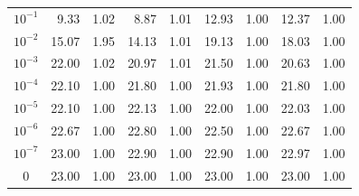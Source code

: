 \documentclass{article}
\begin{document}
\begin{table}[t]
\begin{tabular}{| c | r  r | r  r | r  r | r  r |}
$10^{-1}$        & 9.33  & 1.02  & 8.87  & 1.01  & 12.93        & 1.00         & 12.37        & 1.00        \\
$10^{-2}$        & 15.07         & 1.95  & 14.13         & 1.01  & 19.13        & 1.00         & 18.03        & 1.00        \\
$10^{-3}$        & 22.00         & 1.02  & 20.97         & 1.01  & 21.50         & 1.00  & 20.63         & 1.00 \\
$10^{-4}$        & 22.10         & 1.00  & 21.80         & 1.00  & 21.93         & 1.00  & 21.80         & 1.00 \\
$10^{-5}$        & 22.10         & 1.00  & 22.13        & 1.00         & 22.00         & 1.00  & 22.03         & 1.00 \\
$10^{-6}$	 & 22.67	 & 1.00	 & 22.80	 & 1.00	 & 22.50	 & 1.00	 & 22.67	 & 1.00	\\
$10^{-7}$	 & 23.00	 & 1.00	 & 22.90	 & 1.00	 & 22.90	 & 1.00	 & 22.97	 & 1.00	\\
0        & 23.00         & 1.00          & 23.00        & 1.00         & 23.00        & 1.00         & 23.00        & 1.00        \\
\hline

\end{tabular}
\end{table}
\end{document}
